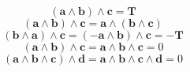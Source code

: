 \documentclass[11pt, a4paper, fleqn]{report}
\numberwithin{equation}{section}
\begin{document}
\begin{equation}
    (\mathbf{a}\wedge\mathbf{b})\wedge\mathbf{c}=\mathbf{T}
\end{equation}
\begin{equation}
    (\mathbf{a}\wedge\mathbf{b})\wedge\mathbf{c}=\mathbf{a}\wedge(\mathbf{b}\wedge\mathbf{c})
\end{equation}
\begin{equation}
    (\mathbf{b}\wedge\mathbf{a})\wedge\mathbf{c}=(-\mathbf{a}\wedge\mathbf{b})\wedge\mathbf{c}=-\mathbf{T}
\end{equation}
\begin{equation}
    (\mathbf{a}\wedge\mathbf{b})\wedge\mathbf{c}=\mathbf{a}\wedge\mathbf{b}\wedge\mathbf{c}=0
\end{equation}
\begin{equation}
    (\mathbf{a}\wedge\mathbf{b}\wedge\mathbf{c})\wedge\mathbf{d}=\mathbf{a}\wedge\mathbf{b}\wedge\mathbf{c}\wedge\mathbf{d}=0
\end{equation}
\end{document}
